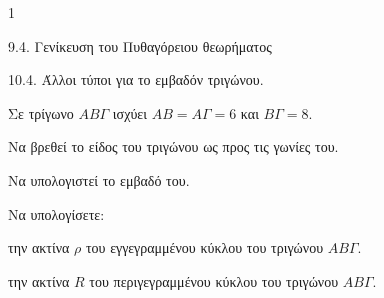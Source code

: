 \begin{ylh}{1}
    \item 9.4. Γενίκευση του Πυθαγόρειου θεωρήματος
    \item 10.4. Άλλοι τύποι για το εμβαδόν τριγώνου.
\end{ylh}
Σε τρίγωνο $ΑΒΓ$ ισχύει $ΑΒ = ΑΓ = 6$ και $ΒΓ = 8$.
\begin{alist}
    \item Να βρεθεί το είδος του τριγώνου ως προς τις γωνίες του. 
    \item Να υπολογιστεί το εμβαδό του. 
    \item Να υπολογίσετε:
    \begin{rlist}
        \item την ακτίνα $ρ$ του εγγεγραμμένου κύκλου του τριγώνου $ΑΒΓ$.
        \item την ακτίνα $R$ του περιγεγραμμένου κύκλου του τριγώνου $ΑΒΓ$.
    \end{rlist} 
\end{alist}